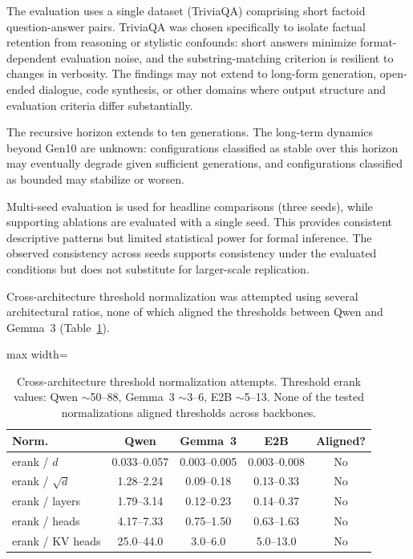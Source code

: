 \documentclass[a4paper,fleqn]{cas-dc}
\renewcommand{\arraystretch}{1.8}
\begin{document}
The evaluation uses a single dataset (TriviaQA) comprising short factoid
question-answer pairs. TriviaQA was chosen specifically to isolate factual
retention from reasoning or stylistic confounds: short answers minimize
format-dependent evaluation noise, and the substring-matching criterion is
resilient to changes in verbosity. The findings may not extend to long-form
generation, open-ended dialogue, code synthesis, or other domains where output
structure and evaluation criteria differ substantially.

The recursive horizon extends to ten generations. The long-term dynamics beyond
Gen10 are unknown: configurations classified as stable over this horizon
may eventually degrade given sufficient generations, and configurations
classified as bounded may stabilize or worsen.

Multi-seed evaluation is used for headline comparisons (three seeds), while
supporting ablations are evaluated with a single seed. This provides consistent
descriptive patterns but limited statistical power for formal inference. The
observed consistency across seeds supports consistency under the evaluated
conditions but does not substitute for larger-scale replication.

Cross-architecture threshold normalization was attempted using several
architectural ratios, none of which aligned the thresholds between Qwen and
Gemma~3 (Table~\ref{tab:normalization}).

\begin{table}[htbp]
\caption{Cross-architecture threshold normalization attempts. Threshold erank
values: Qwen ${\sim}$50--88, Gemma~3 ${\sim}$3--6, E2B ${\sim}$5--13. None of
the tested normalizations aligned thresholds across
backbones.}\label{tab:normalization}
\footnotesize
\renewcommand{\arraystretch}{1.4}
\begin{adjustbox}{max width=\columnwidth}
\begin{tabular}{@{}lcccc@{}}
\toprule
\textbf{Norm.} & \textbf{Qwen} & \textbf{Gemma~3} & \textbf{E2B} & \textbf{Aligned?} \\
\midrule
erank / $d$        & 0.033--0.057 & 0.003--0.005 & 0.003--0.008 & No \\
\addlinespace
erank / $\sqrt{d}$ & 1.28--2.24   & 0.09--0.18   & 0.13--0.33   & No \\
\addlinespace
erank / layers     & 1.79--3.14   & 0.12--0.23   & 0.14--0.37   & No \\
\addlinespace
erank / heads      & 4.17--7.33   & 0.75--1.50   & 0.63--1.63   & No \\
\addlinespace
erank / KV heads   & 25.0--44.0   & 3.0--6.0     & 5.0--13.0    & No \\
\bottomrule
\end{tabular}
\end{adjustbox}
\end{table}
\end{document}
